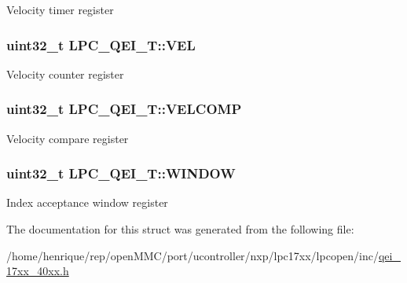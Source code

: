 Velocity timer register \hypertarget{structLPC__QEI__T_a15e45a6723e72a83eb3c2671b1c1f43d}{
\subsubsection[{V\-E\-L}]{ uint32\-\_\-t L\-P\-C\-\_\-\-Q\-E\-I\-\_\-\-T\-::\-V\-E\-L}}\label{structLPC__QEI__T_a15e45a6723e72a83eb3c2671b1c1f43d}
Velocity counter register \hypertarget{structLPC__QEI__T_a5237f6f2f6ed6530bbf6a13d0e20151f}{
\subsubsection[{V\-E\-L\-C\-O\-M\-P}]{ uint32\-\_\-t L\-P\-C\-\_\-\-Q\-E\-I\-\_\-\-T\-::\-V\-E\-L\-C\-O\-M\-P}}\label{structLPC__QEI__T_a5237f6f2f6ed6530bbf6a13d0e20151f}
Velocity compare register \hypertarget{structLPC__QEI__T_af75222d15c3a2744586a5f27a0549c18}{
\subsubsection[{W\-I\-N\-D\-O\-W}]{ uint32\-\_\-t L\-P\-C\-\_\-\-Q\-E\-I\-\_\-\-T\-::\-W\-I\-N\-D\-O\-W}}\label{structLPC__QEI__T_af75222d15c3a2744586a5f27a0549c18}
Index acceptance window register 

The documentation for this struct was generated from the following file\-:\begin{DoxyCompactItemize}
\item 
/home/henrique/rep/open\-M\-M\-C/port/ucontroller/nxp/lpc17xx/lpcopen/inc/\hyperlink{qei__17xx__40xx_8h}{qei\-\_\-17xx\-\_\-40xx.\-h}\end{DoxyCompactItemize}
